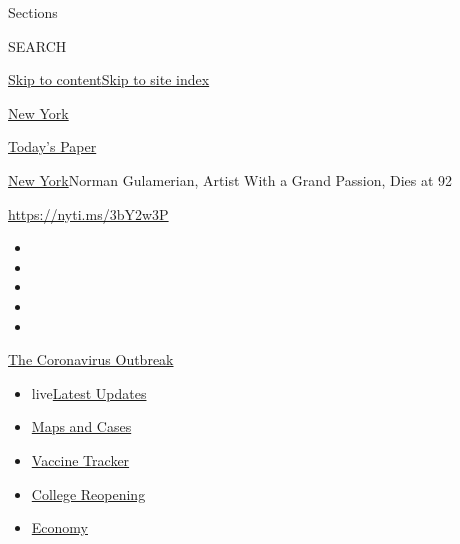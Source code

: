 Sections

SEARCH

\protect\hyperlink{site-content}{Skip to
content}\protect\hyperlink{site-index}{Skip to site index}

\href{https://www.nytimes3xbfgragh.onion/section/nyregion}{New York}

\href{https://myaccount.nytimes3xbfgragh.onion/auth/login?response_type=cookie\&client_id=vi}{}

\href{https://www.nytimes3xbfgragh.onion/section/todayspaper}{Today's
Paper}

\href{/section/nyregion}{New York}\textbar{}Norman Gulamerian, Artist
With a Grand Passion, Dies at 92

\url{https://nyti.ms/3bY2w3P}

\begin{itemize}
\item
\item
\item
\item
\item
\end{itemize}

\href{https://www.nytimes3xbfgragh.onion/news-event/coronavirus?action=click\&pgtype=Article\&state=default\&region=TOP_BANNER\&context=storylines_menu}{The
Coronavirus Outbreak}

\begin{itemize}
\tightlist
\item
  live\href{https://www.nytimes3xbfgragh.onion/2020/08/04/world/coronavirus-covid-19.html?action=click\&pgtype=Article\&state=default\&region=TOP_BANNER\&context=storylines_menu}{Latest
  Updates}
\item
  \href{https://www.nytimes3xbfgragh.onion/interactive/2020/us/coronavirus-us-cases.html?action=click\&pgtype=Article\&state=default\&region=TOP_BANNER\&context=storylines_menu}{Maps
  and Cases}
\item
  \href{https://www.nytimes3xbfgragh.onion/interactive/2020/science/coronavirus-vaccine-tracker.html?action=click\&pgtype=Article\&state=default\&region=TOP_BANNER\&context=storylines_menu}{Vaccine
  Tracker}
\item
  \href{https://www.nytimes3xbfgragh.onion/2020/08/02/us/covid-college-reopening.html?action=click\&pgtype=Article\&state=default\&region=TOP_BANNER\&context=storylines_menu}{College
  Reopening}
\item
  \href{https://www.nytimes3xbfgragh.onion/live/2020/08/03/business/stock-market-today-coronavirus?action=click\&pgtype=Article\&state=default\&region=TOP_BANNER\&context=storylines_menu}{Economy}
\end{itemize}

